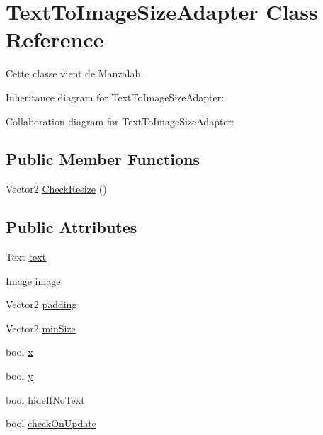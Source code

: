 \hypertarget{class_text_to_image_size_adapter}{}\section{Text\+To\+Image\+Size\+Adapter Class Reference}
\label{class_text_to_image_size_adapter}


Cette classe vient de Manzalab.  




Inheritance diagram for Text\+To\+Image\+Size\+Adapter\+:


Collaboration diagram for Text\+To\+Image\+Size\+Adapter\+:
\subsection*{Public Member Functions}
\begin{DoxyCompactItemize}
\item 
Vector2 \hyperlink{class_text_to_image_size_adapter_a38740149c696306f88d0efe76d91fbd7}{Check\+Resize} ()
\end{DoxyCompactItemize}
\subsection*{Public Attributes}
\begin{DoxyCompactItemize}
\item 
Text \hyperlink{class_text_to_image_size_adapter_a41c33f95122d0949f7f65462482cb930}{text}
\item 
Image \hyperlink{class_text_to_image_size_adapter_ad3930fa2032244a8f2f90edd9c154975}{image}
\item 
Vector2 \hyperlink{class_text_to_image_size_adapter_a868f5ae8041bfe330fab3637e81a4a8e}{padding}
\item 
Vector2 \hyperlink{class_text_to_image_size_adapter_a6dfe5510c5f068eb3b6fead3388a0429}{min\+Size}
\item 
bool \hyperlink{class_text_to_image_size_adapter_a587a45f5568eb0d384724fb8649403f7}{x}
\item 
bool \hyperlink{class_text_to_image_size_adapter_a5faa4a6091e8c3fc622623c0b8f2fa56}{y}
\item 
bool \hyperlink{class_text_to_image_size_adapter_a289adb691109ef28a1f67fab5bdebefc}{hide\+If\+No\+Text}
\item 
bool \hyperlink{class_text_to_image_size_adapter_a37abb193a85714213eac32484afc8d4f}{check\+On\+Update}
\end{DoxyCompactItemize}


